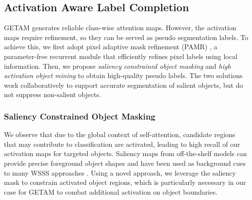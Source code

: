 \documentclass[10pt,twocolumn,letterpaper]{article}
\begin{document}
\subsection{Activation Aware Label Completion}
GETAM generates reliable class-wise attention maps.
However, the activation maps require refinement, so they can be served as pseudo segmentation labels.
To achieve this, 
we first adopt pixel adaptive mask refinement (PAMR) \cite{Araslanov_2020_CVPR},
a parameter-free recurrent module that efficiently refines pixel labels using local information. 
Then, we propose
\textit{saliency constrained object masking} and \textit{high activation object mining} to obtain high-quality pseudo 
labels. 
The two solutions work collaboratively to
support accurate segmentation of salient objects, but do not suppress non-salient objects. 


\subsubsection{Saliency Constrained Object Masking}
We observe that due to the global context of self-attention, candidate regions that may contribute to classification
are activated, leading to high recall of our activation maps for targeted objects.
Saliency maps from off-the-shelf models can provide precise foreground object shapes and have been used as background cues to many WSSS approaches \cite{fan2020learning,jiang2019integral,lee2019ficklenet,sun2020mining,wang2018weakly,lee2021railroad,yao2021non}. 
Using a novel approach, we leverage 
the saliency mask to constrain activated object regions, which is particularly necessary in our case for GETAM to combat additional activation on object boundaries.
\end{document}
